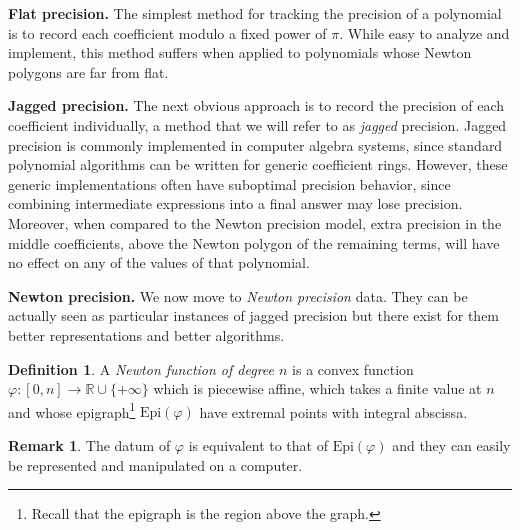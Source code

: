 \documentclass{sig-alternate-05-2015}
\newcommand{\R}{\mathbb R}
\newcommand{\Epi}{\textrm{Epi}}
\theoremstyle{definition}
\newtheorem{rem}[theo]{Remark}
\newtheorem{deftn}[theo]{Definition}
\begin{document}
\medskip

\noindent
{\bf Flat precision.}
The simplest method for tracking the precision of a polynomial is
to record each coefficient modulo a fixed power of $\pi$.  While
easy to analyze and implement, this method suffers when
applied to polynomials whose Newton polygons are far from flat.

\medskip

\noindent
{\bf Jagged precision.}
The next obvious approach is to record the precision of each
coefficient individually, a method that we will refer to as \emph{jagged}
precision.  Jagged precision is commonly implemented
in computer algebra systems, since standard polynomial algorithms
can be written for generic coefficient rings.  However, these
generic implementations often have suboptimal precision behavior,
since combining intermediate expressions into a final answer
may lose precision.  Moreover, when compared to the Newton
precision model, extra precision in the middle coefficients, above
the Newton polygon of the remaining terms, will have no effect
on any of the values of that polynomial.

\medskip

\noindent
{\bf Newton precision.} 
We now move to \emph{Newton precision} data. They can be actually seen 
as particular instances of jagged precision but there exist for them 
better representations and better algorithms.

\begin{deftn}
A \emph{Newton function of degree $n$} is a convex function 
$\varphi : [0,n] \to \R \cup \{+\infty\}$ which is piecewise affine, 
which takes a finite value at $n$ and whose epigraph\footnote{Recall
that the epigraph is the region above the graph.} $\Epi(\varphi)$ 
have extremal points with integral abscissa.
\end{deftn}

\begin{rem}
The datum of $\varphi$ is equivalent to that of $\Epi(\varphi)$ and they 
can easily be represented and manipulated on a computer.
\end{rem}
\end{document}
